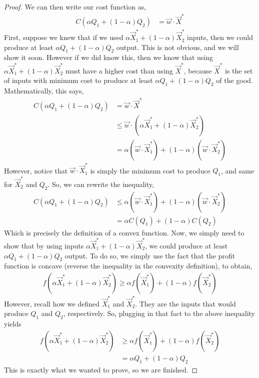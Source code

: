 \begin{description}
\begin{proof}
        We can then write our cost function as,
        \begin{align*}
            C(\alpha Q_1 + (1 - \alpha) Q_2) &= \vec{w} \cdot \vec{X}^*
        \end{align*}
        First, suppose we knew that if we used $\alpha \vec{X}_1^* + (1 - \alpha) \vec{X}_2^*$ inputs, then we could produce at least $\alpha Q_1 + (1 - \alpha) Q_2$ output. This is not obvious, and we will show it soon. However if we did know this, then we know that using $\alpha \vec{X}_1^* + (1 - \alpha) \vec{X}_2^*$ must have a higher cost than using $\vec{X}^*$, because $\vec{X}^*$ is the set of inputs with minimum cost to produce at least $\alpha Q_1 + (1 - \alpha) Q_2$ of the good. Mathematically, this says,
        \begin{align*}
            C(\alpha Q_1 + (1 - \alpha) Q_2) &= \vec{w} \cdot \vec{X}^* \\
            &\leq \vec{w} \cdot (\alpha \vec{X}_1^* + (1 - \alpha) \vec{X}_2^*) \\
            &= \alpha (\vec{w} \cdot \vec{X}_1^*) + (1 - \alpha) (\vec{w} \cdot \vec{X}_2^*)
        \end{align*}
        However, notice that $\vec{w} \cdot \vec{X}_1^*$ is simply the minimum cost to produce $Q_1$, and same for $\vec{X}_2^*$ and $Q_2$. So, we can rewrite the inequality, 
        \begin{align*}
            C(\alpha Q_1 + (1 - \alpha) Q_2) &\leq \alpha (\vec{w} \cdot \vec{X}_1^*) + (1 - \alpha) (\vec{w} \cdot \vec{X}_2^*) \\
            &= \alpha C(Q_1) + (1 - \alpha)C(Q_2)
        \end{align*}
        Which is precisely the definition of a convex function. Now, we simply need to show that by using inputs $\alpha \vec{X}_1^* + (1 - \alpha) \vec{X}_2^*$, we could produce at least $\alpha Q_1 + (1 - \alpha) Q_2$ output. To do so, we simply use the fact that the profit function is concave (reverse the inequality in the convexity definition), to obtain,
        \begin{align*}
            f(\alpha \vec{X}_1^* + (1 - \alpha) \vec{X}_2^*) \geq \alpha f(\vec{X}_1^*) + (1 - \alpha) f(\vec{X}_2^*)
        \end{align*}
        However, recall how we defined $\vec{X}_1^*$ and $\vec{X}_2^*$. They are the inputs that would produce $Q_1$ and $Q_2$, respectively. So, plugging in that fact to the above inequality yields 
        \begin{align*}
            f(\alpha \vec{X}_1^* + (1 - \alpha) \vec{X}_2^*) &\geq \alpha f(\vec{X}_1^*) + (1 - \alpha) f(\vec{X}_2^*) \\
            &= \alpha Q_1 + (1 - \alpha) Q_2
        \end{align*}
        This is exactly what we wanted to prove, so we are finished.
    \end{proof}
    
\end{description}

